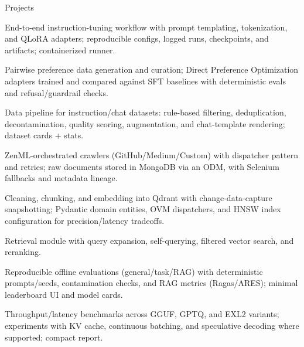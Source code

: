 \begin{rubricnorepeat}{Projects}
\noentry{~}

End-to-end instruction-tuning workflow with prompt templating, tokenization, and QLoRA adapters; reproducible configs, logged runs, checkpoints, and artifacts; containerized runner.\hfill \href{https://github.com/musel25/instruction-tuning}{\faGithub}

Pairwise preference data generation and curation; Direct Preference Optimization adapters trained and compared against SFT baselines with deterministic evals and refusal/guardrail checks.\hfill \href{https://github.com/musel25/preference-alignment-dpo}{\faGithub}

Data pipeline for instruction/chat datasets: rule-based filtering, deduplication, decontamination, quality scoring, augmentation, and chat-template rendering; dataset cards + stats.\hfill \href{https://github.com/musel25/instruction-dataset-factory}{\faGithub}

ZenML-orchestrated crawlers (GitHub/Medium/Custom) with dispatcher pattern and retries; raw documents stored in MongoDB via an ODM, with Selenium fallbacks and metadata lineage.\hfill \href{https://github.com/musel25/llm-twin-data-pipeline}{\faGithub}

Cleaning, chunking, and embedding into Qdrant with change-data-capture snapshotting; Pydantic domain entities, OVM dispatchers, and HNSW index configuration for precision/latency tradeoffs.\hfill \href{https://github.com/musel25/rag-feature-pipeline}{\faGithub}

Retrieval module with query expansion, self-querying, filtered vector search, and reranking.
\hfill \href{https://github.com/musel25/rag-inference-advanced}{\faGithub}

Reproducible offline evaluations (general/task/RAG) with deterministic prompts/seeds, contamination checks, and RAG metrics (Ragas/ARES); minimal leaderboard UI and model cards.\hfill \href{https://github.com/musel25/llm-eval-harness}{\faGithub}

Throughput/latency benchmarks across GGUF, GPTQ, and EXL2 variants; experiments with KV cache, continuous batching, and speculative decoding where supported; compact report.\hfill \href{https://github.com/musel25/inference-optimization-quantization}{\faGithub}


\end{rubricnorepeat}
